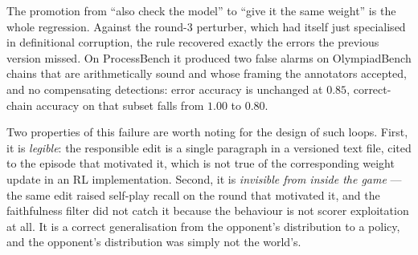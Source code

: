 \documentclass{article} %
\begin{document}
The promotion from ``also check the model'' to ``give it the same weight'' is the whole
regression. Against the round-3 perturber, which had itself just specialised in definitional
corruption, the rule recovered exactly the errors the previous version missed. On
ProcessBench it produced two false alarms on OlympiadBench chains that are arithmetically
sound and whose framing the annotators accepted, and no compensating detections: error
accuracy is unchanged at $0.85$, correct-chain accuracy on that subset falls from $1.00$ to
$0.80$.

Two properties of this failure are worth noting for the design of such loops. First, it is
\emph{legible}: the responsible edit is a single paragraph in a versioned text file, cited to
the episode that motivated it, which is not true of the corresponding weight update in an RL
implementation. Second, it is \emph{invisible from inside the game} --- the same edit raised
self-play recall on the round that motivated it, and the faithfulness filter did not catch it
because the behaviour is not scorer exploitation at all. It is a correct generalisation from
the opponent's distribution to a policy, and the opponent's distribution was simply not the
world's.
\end{document}

